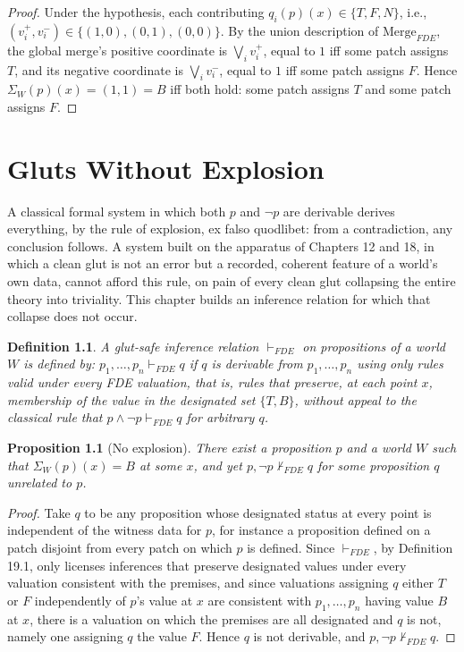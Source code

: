 \documentclass[11pt]{book}
\newtheorem{definition}[theorem]{Definition}
\newtheorem{proposition}[theorem]{Proposition}
\begin{document}
\begin{proof}
Under the hypothesis, each contributing $q_i(p)(x) \in \{T,F,N\}$, i.e., $(v_i^+,v_i^-) \in \{(1,0),(0,1),(0,0)\}$. By the union description of $\mathrm{Merge}_{FDE}$, the global merge's positive coordinate is $\bigvee_i v_i^+$, equal to $1$ iff some patch assigns $T$, and its negative coordinate is $\bigvee_i v_i^-$, equal to $1$ iff some patch assigns $F$. Hence $\Sigma_W(p)(x) = (1,1) = B$ iff both hold: some patch assigns $T$ and some patch assigns $F$.
\end{proof}

\chapter{Gluts Without Explosion}

A classical formal system in which both $p$ and $\neg p$ are derivable derives everything, by the rule of explosion, ex falso quodlibet: from a contradiction, any conclusion follows. A system built on the apparatus of Chapters 12 and 18, in which a clean glut is not an error but a recorded, coherent feature of a world's own data, cannot afford this rule, on pain of every clean glut collapsing the entire theory into triviality. This chapter builds an inference relation for which that collapse does not occur.

\begin{definition}
A \emph{glut-safe inference relation} $\vdash_{FDE}$ on propositions of a world $W$ is defined by: $p_1, \dots, p_n \vdash_{FDE} q$ if $q$ is derivable from $p_1, \dots, p_n$ using only rules valid under every FDE valuation, that is, rules that preserve, at each point $x$, membership of the value in the \emph{designated} set $\{T, B\}$, without appeal to the classical rule that $p \wedge \neg p \vdash_{FDE} q$ for arbitrary $q$.
\end{definition}

\begin{proposition}[No explosion]
There exist a proposition $p$ and a world $W$ such that $\Sigma_W(p)(x) = B$ at some $x$, and yet $p, \neg p \not\vdash_{FDE} q$ for some proposition $q$ unrelated to $p$.
\end{proposition}

\begin{proof}
Take $q$ to be any proposition whose designated status at every point is independent of the witness data for $p$, for instance a proposition defined on a patch disjoint from every patch on which $p$ is defined. Since $\vdash_{FDE}$, by Definition 19.1, only licenses inferences that preserve designated values under every valuation consistent with the premises, and since valuations assigning $q$ either $T$ or $F$ independently of $p$'s value at $x$ are consistent with $p_1, \dots, p_n$ having value $B$ at $x$, there is a valuation on which the premises are all designated and $q$ is not, namely one assigning $q$ the value $F$. Hence $q$ is not derivable, and $p, \neg p \not\vdash_{FDE} q$.
\end{proof}
\end{document}
